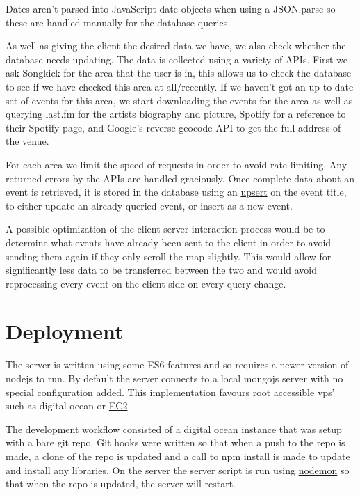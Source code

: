 \documentclass[10pt]{article}
\begin{document}
        Dates aren't parsed into JavaScript date objects when using a JSON.parse so these are handled manually for the database queries.

        As well as giving the client the desired data we have, we also check whether the database needs updating. The data is collected using a variety of APIs. First we ask Songkick for the area that the user is in, this allows us to check the database to see if we have checked this area at all/recently. If we haven't got an up to date set of events for this area, we start downloading the events for the area as well as querying last.fm for the artists biography and picture, Spotify for a reference to their Spotify page, and Google's reverse geocode API to get the full address of the venue.

        For each area we limit the speed of requests in order to avoid rate limiting. Any returned errors by the APIs are handled graciously. Once complete data about an event is retrieved, it is stored in the database using an \href{https://docs.mongodb.com/manual/reference/method/db.collection.update/#upsert-option}{upsert} on the event title, to either update an already queried event, or insert as a new event.

        A possible optimization of the client-server interaction process would be to determine what events have already been sent to the client in order to avoid sending them again if they only scroll the map slightly. This would allow for significantly less data to be transferred between the two and would avoid reprocessing every event on the client side on every query change.


    \section{Deployment}
        The server is written using some ES6 features and so requires a newer version of nodejs to run. By default the server connects to a local mongojs server with no special configuration added. This implementation favours root accessible vps' such as digital ocean or \href{https://aws.amazon.com/ec2/}{EC2}.

        The development workflow consisted of a digital ocean instance that was setup with a bare git repo. Git hooks were written so that when a push to the repo is made, a clone of the repo is updated and a call to npm install is made to update and install any libraries. On the server the server script is run using \href{https://github.com/remy/nodemon}{nodemon} so that when the repo is updated, the server will restart.
\end{document}
